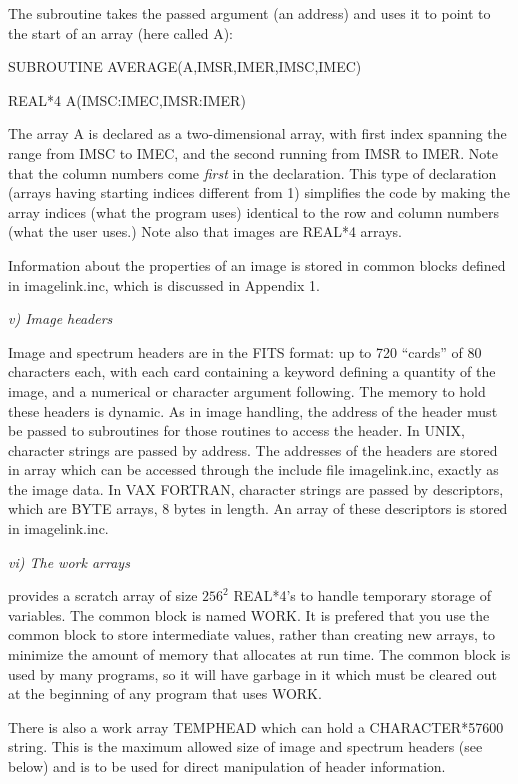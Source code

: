 The subroutine takes the passed argument (an address) and uses it
to point to the start of an array (here called A):

\vskip 0.15in
	SUBROUTINE AVERAGE(A,IMSR,IMER,IMSC,IMEC)

	REAL*4 A(IMSC:IMEC,IMSR:IMER)
	
\vskip 0.15in
	The array A is declared as a two-dimensional array, with first
index spanning the range from IMSC to IMEC, and the second running
from IMSR to IMER.  Note that the column numbers come {\it first} in
the declaration.  This type of declaration (arrays having starting
indices different from 1) simplifies the code by making the array
indices (what the program uses) identical to the row and column
numbers (what the \V user uses.)  Note also that images are REAL*4
arrays. 

	Information about the properties of an image is stored in
common blocks defined in imagelink.inc, which is discussed in
Appendix 1. 

\Sskip
\centerline {\it v) Image headers}

	Image and spectrum headers are in the FITS format:  up to 720
``cards'' of 80 characters each, with each card containing a keyword 
defining a quantity of the image, and a numerical or character 
argument following.  The memory to hold these headers 
is dynamic.  As in image handling, the address of the header 
must be passed to subroutines for those routines to access the 
header.  In UNIX, character strings are passed by address. The addresses
of the headers are stored in array which can be accessed through the 
include file imagelink.inc, exactly as the image data.
In VAX FORTRAN, character strings are passed by 
descriptors, which are BYTE arrays, 8 bytes in length.  An array of 
these descriptors is stored in imagelink.inc.

\Sskip
\centerline {\it vi)  The work arrays}
	
	\V provides a scratch array of size $256^2$ REAL*4's to handle
temporary storage of variables.  The common block is named WORK. It is
prefered that you use the common block to store intermediate values,
rather than creating new arrays, to minimize the amount of memory
that \V allocates at run time.  The common block is used by many \V
programs, so it will have garbage in it which must be cleared out at
the beginning of any program that uses WORK. 

	There is also a work array TEMPHEAD which can hold a 
CHARACTER*57600 string.  This is the maximum allowed size of image and spectrum 
headers (see below) and is to be used for direct manipulation of 
header information.

